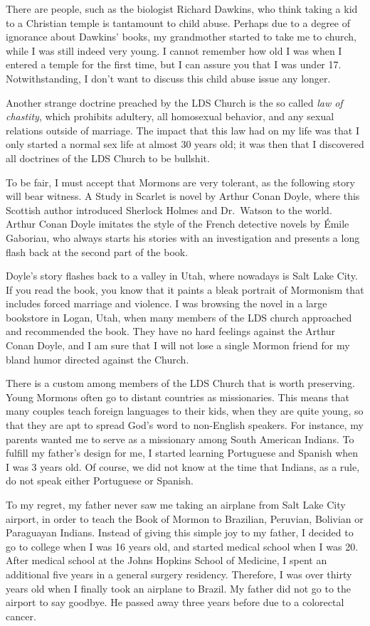 \documentclass[
  12pt,
]{book}
\begin{document}
There are people, such as the biologist Richard Dawkins, who think
taking a kid to a Christian temple is tantamount to child abuse. Perhaps
due to a degree of ignorance about Dawkins' books, my grandmother
started to take me to church, while I was still indeed very young. I
cannot remember how old I was when I entered a temple for the first
time, but I can assure you that I was under 17. Notwithstanding, I don't
want to discuss this child abuse issue any longer.

Another strange doctrine preached by the LDS Church is the so called
\emph{law of chastity}, which prohibits adultery, all homosexual
behavior, and any sexual relations outside of marriage. The impact that
this law had on my life was that I only started a normal sex life at
almost 30 years old; it was then that I discovered all doctrines of the
LDS Church to be bullshit.

To be fair, I must accept that Mormons are very tolerant, as the
following story will bear witness. A Study in Scarlet is novel by Arthur
Conan Doyle, where this Scottish author introduced Sherlock Holmes and
Dr.~Watson to the world. Arthur Conan Doyle imitates the style of the
French detective novels by Émile Gaboriau, who always starts his stories
with an investigation and presents a long flash back at the second part
of the book.

Doyle's story flashes back to a valley in Utah, where nowadays is Salt
Lake City. If you read the book, you know that it paints a bleak
portrait of Mormonism that includes forced marriage and violence. I was
browsing the novel in a large bookstore in Logan, Utah, when many
members of the LDS church approached and recommended the book. They have
no hard feelings against the Arthur Conan Doyle, and I am sure that I
will not lose a single Mormon friend for my bland humor directed against
the Church.

There is a custom among members of the LDS Church that is worth
preserving. Young Mormons often go to distant countries as missionaries.
This means that many couples teach foreign languages to their kids, when
they are quite young, so that they are apt to spread God's word to
non-English speakers. For instance, my parents wanted me to serve as a
missionary among South American Indians. To fulfill my father's design
for me, I started learning Portuguese and Spanish when I was 3 years
old. Of course, we did not know at the time that Indians, as a rule, do
not speak either Portuguese or Spanish.

To my regret, my father never saw me taking an airplane from Salt Lake
City airport, in order to teach the Book of Mormon to Brazilian,
Peruvian, Bolivian or Paraguayan Indians. Instead of giving this simple
joy to my father, I decided to go to college when I was 16 years old,
and started medical school when I was 20. After medical school at the
Johns Hopkins School of Medicine, I spent an additional five years in a
general surgery residency. Therefore, I was over thirty years old when I
finally took an airplane to Brazil. My father did not go to the airport
to say goodbye. He passed away three years before due to a colorectal
cancer.
\end{document}
